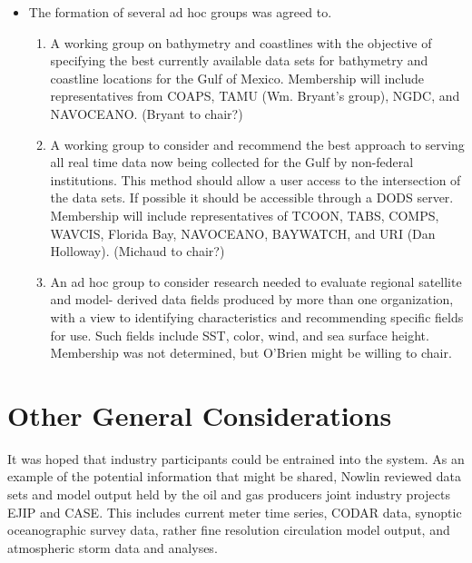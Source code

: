 \begin{enumerate}
\begin{itemize}
\item  The formation of several ad hoc groups was agreed to.

  \begin{enumerate}
  \item A working group on bathymetry and coastlines with the
    objective of specifying the best currently available data sets for
    bathymetry and coastline locations for the Gulf of Mexico.
    Membership will include representatives from COAPS, TAMU (Wm.
    Bryant's group), NGDC, and NAVOCEANO. (Bryant to chair?)
    
  \item A working group to consider and recommend the best approach to
    serving all real time data now being collected for the Gulf by
    non-federal institutions. This method should allow a user access
    to the intersection of the data sets. If possible it should be
    accessible through a DODS server. Membership will include
    representatives of TCOON, TABS, COMPS, WAVCIS, Florida Bay,
    NAVOCEANO, BAYWATCH, and URI (Dan Holloway).  (Michaud to chair?)

    
  \item An ad hoc group to consider research needed to evaluate
    regional satellite and model- derived data fields produced by more
    than one organization, with a view to identifying characteristics
    and recommending specific fields for use. Such fields include SST,
    color, wind, and sea surface height. Membership was not
    determined, but O'Brien might be willing to chair.

  \end{enumerate}
\end{itemize}


\end{enumerate}


\section{Other General Considerations}

It was hoped that industry participants could be entrained into the system. As an example of the 
potential information that might be shared, Nowlin reviewed data sets and model output held by 
the oil and gas producers joint industry projects EJIP and CASE. This includes current meter 
time series, CODAR data, synoptic oceanographic survey data, rather fine resolution circulation 
model output, and atmospheric storm data and analyses.

